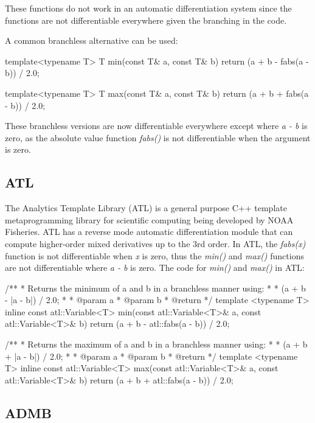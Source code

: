 \documentclass[oneside]{article}
\begin{document}
These functions do not work in an automatic differentiation system since the functions are not differentiable everywhere given the branching in the code.

A common branchless alternative can be used:

\begin{cppsource}
template<typename T>
T min(const T& a, const T& b){
   return (a + b - fabs(a - b)) / 2.0;
}

template<typename T>
T max(const T& a, const T& b){
   return (a + b + fabs(a - b)) / 2.0;
}
\end{cppsource}

These branchless versions are now differentiable everywhere except where \textit{a - b} is zero, as the absolute value function \textit{fabs()} is not differentiable when the argument is zero.

\subsection{ATL}

The Analytics Template Library (ATL) is a general purpose C++ template metaprogramming library for scientific computing being developed by NOAA Fisheries. ATL has a reverse mode automatic differentiation module that can compute higher-order mixed derivatives up to the 3rd order. In ATL, the \textit{fabs(x)} function is not differentiable when \textit{x} is zero, thus the \textit{min()} and \textit{max()} functions are not differentiable where \textit{a - b} is zero. The code for \textit{min()} and \textit{max()} in ATL:

\begin{cppsource}

/**
 * Returns the minimum of a and b in a branchless manner using:
 *
 * (a + b - |a - b|) / 2.0;
 *
 * @param a
 * @param b
 * @return
 */
template <typename T>
inline const atl::Variable<T> min(const atl::Variable<T>& a,
	const atl::Variable<T>& b) {
    return (a + b - atl::fabs(a - b)) / 2.0;
}

/**
 * Returns the maximum of a and b in a branchless manner using:
 *
 * (a + b + |a - b|) / 2.0;
 *
 * @param a
 * @param b
 * @return
 */
template <typename T>
inline const atl::Variable<T> max(const atl::Variable<T>& a,
	const atl::Variable<T>& b) {
    return (a + b + atl::fabs(a - b)) / 2.0;
}


\end{cppsource}


\subsection{ADMB}
\end{document}
